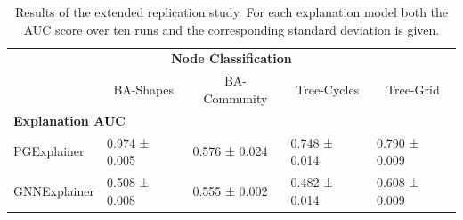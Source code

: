 

\begin{table}[]
\centering
\begin{tabular}{lllll}
\toprule
\multicolumn{5}{c}{\textbf{Node Classification}} \\
\multicolumn{1}{c}{} & \multicolumn{1}{c}{BA-Shapes} & \multicolumn{1}{c}{BA-Community} & \multicolumn{1}{c}{Tree-Cycles} & \multicolumn{1}{c}{Tree-Grid} \\ \hline
\multicolumn{5}{l}{\textbf{Explanation AUC}} \\ \hline
PGExplainer & 0.974 ± 0.005 & 0.576 ± 0.024 & 0.748 ± 0.014 & \multicolumn{1}{l}{0.790 ± 0.009} \\
GNNExplainer & 0.508 ± 0.008 & 0.555 ± 0.002 & 0.482 ± 0.014 & \multicolumn{1}{l}{0.608 ± 0.009} \\ \bottomrule
\end{tabular}
\caption{Results of the extended replication study. For each explanation model both the AUC score over ten runs and the corresponding standard deviation is given. }
\label{tab:extended_replication_results}
\end{table}


